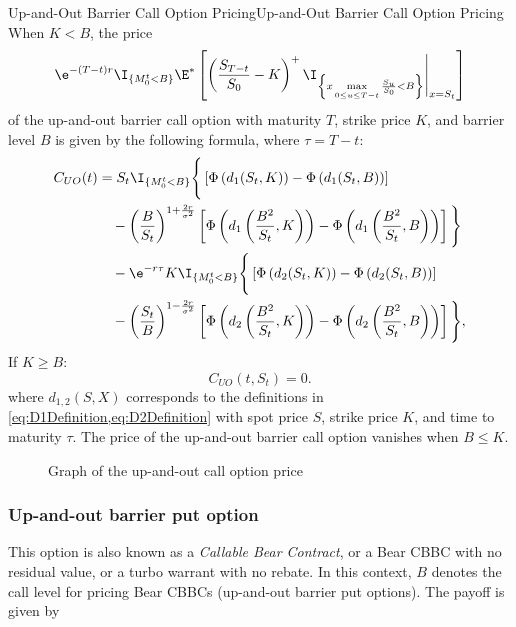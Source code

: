 \begin{prop}{Up-and-Out Barrier Call Option Pricing}{Up-and-Out Barrier Call Option Pricing}
	When \(K < B\), the price
	\begin{equation}
		\e^{-(T-t)r} \I_{\{M_0^t < B\}} \E^* \left[ \left( \frac{S_{T-t}}{S_0} - K \right)^+ \I_{\left\{ x \max\limits_{0 \le u \le T-t} \frac{S_u}{S_0} < B \right\}} \Bigg|_{x=S_t} \right]
	\end{equation}
	of the up-and-out barrier call option with maturity \(T\), strike price \(K\), and barrier level \(B\) is given by the following formula, where \(\tau = T-t\):
	\begin{align}
		C_{UO}(t) & = S_t \I_{\{M_0^t < B\}} \Bigg\{ \left[ \Phi \left( d_1(S_t, K) \right) - \Phi \left( d_1(S_t, B) \right) \right] \nonumber                                                                                   \\
		          & \quad - \left( \frac{B}{S_t} \right)^{1+\frac{2r}{\sigma^2}} \left[ \Phi \left( d_1\left(\frac{B^2}{S_t}, K\right) \right) - \Phi \left( d_1\left(\frac{B^2}{S_t}, B\right) \right) \right] \Bigg\} \nonumber \\
		          & \quad - \e^{-r\tau} K \I_{\{M_0^t < B\}} \Bigg\{ \left[ \Phi \left( d_2(S_t, K) \right) - \Phi \left( d_2(S_t, B) \right) \right] \nonumber                                                                   \\
		          & \quad - \left( \frac{S_t}{B} \right)^{1-\frac{2r}{\sigma^2}} \left[ \Phi \left( d_2\left(\frac{B^2}{S_t}, K\right) \right) - \Phi \left( d_2\left(\frac{B^2}{S_t}, B\right) \right) \right] \Bigg\},
	\end{align}
	If \(K \ge B\):
	\begin{equation}
		C_{UO}(t, S_t) = 0.
	\end{equation}
	where \(d_{1,2}(S, X)\) corresponds to the definitions in \cref{eq:D1Definition,eq:D2Definition} with spot price \(S\), strike price \(K\), and time to maturity \(\tau\). The price of the up-and-out barrier call option vanishes when \(B \le K\).
\end{prop}

\begin{figure}[H]
	\centering
	
	\caption{Graph of the up-and-out call option price}
	\label{fig:upAndOutCallBarrierSurface}
\end{figure}

\clearpage
\subsubsection{Up-and-out barrier put option}
This option is also known as a \textit{Callable Bear Contract}, or a Bear CBBC with no residual value, or a turbo warrant with no rebate. In this context, \(B\) denotes the call level for pricing Bear CBBCs (up-and-out barrier put options). The payoff is given by

